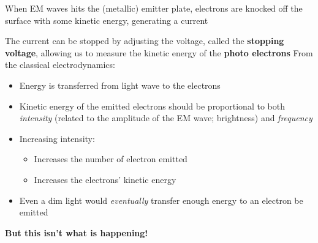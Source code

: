 When EM waves hits the (metallic) emitter plate, electrons are knocked
off the surface with some kinetic energy, generating a current
\begin{center}
\end{center}
The current can be stopped by adjusting the voltage, called the
\textbf{stopping voltage}, allowing us to measure the kinetic energy of the
\textbf{photo electrons}
%
%
%
%
%
From the classical electrodynamics:
\begin{itemize}
\item Energy is transferred from light wave to the electrons
\item Kinetic energy of the emitted electrons should be proportional to both
  \emph{intensity} (related to the amplitude of the EM wave; brightness) and
  \emph{frequency}
\item Increasing intensity:
  \begin{itemize}
  \item Increases the number of electron emitted
  \item Increases the electrons' kinetic energy
  \end{itemize}
\item Even a dim light would \emph{eventually} transfer enough energy to an
  electron be emitted
\end{itemize}
\textbf{But this isn't what is happening!}




